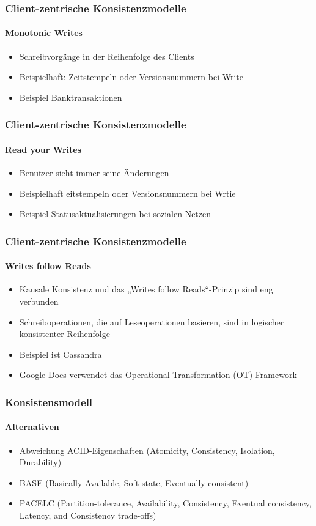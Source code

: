 \begin{frame}
  \frametitle{Client-zentrische Konsistenzmodelle}
  \framesubtitle{Monotonic Writes}
  \begin{itemize}
    \item Schreibvorgänge in der Reihenfolge des Clients
    \item Beispielhaft: Zeitstempeln oder Versionsnummern bei Write 
    \item Beispiel Banktransaktionen
  \end{itemize}
\end{frame}

\begin{frame}
  \frametitle{Client-zentrische Konsistenzmodelle}
  \framesubtitle{Read your Writes}
  \begin{itemize}
    \item Benutzer sieht immer seine Änderungen
    \item Beispielhaft eitstempeln oder Versionsnummern bei Wrtie 
    \item Beispiel Statusaktualisierungen bei sozialen Netzen
  \end{itemize}
\end{frame}


\begin{frame}
  \frametitle{Client-zentrische Konsistenzmodelle}
  \framesubtitle{Writes follow Reads}
  \begin{itemize}
    \item Kausale Konsistenz und das „Writes follow Reads“-Prinzip sind eng verbunden
    \item  Schreiboperationen, die auf Leseoperationen basieren, sind in logischer konsistenter Reihenfolge
    \item Beispiel ist Cassandra 
    \item Google Docs verwendet das Operational Transformation (OT) Framework 
  \end{itemize}
\end{frame}


\begin{frame}
  \frametitle{Konsistensmodell}
  \framesubtitle{Alternativen}
  \begin{itemize}
    \item Abweichung ACID-Eigenschaften (Atomicity, Consistency, Isolation, Durability)
    \item BASE (Basically Available, Soft state, Eventually consistent)
    \item PACELC (Partition-tolerance, Availability, Consistency, Eventual consistency, Latency, and Consistency trade-offs) 
  \end{itemize}
\end{frame}


